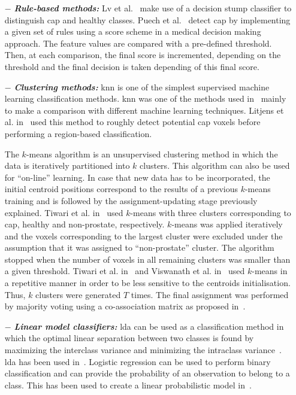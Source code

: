 \begin{enumerate}[leftmargin=*]

\item[$-$] \textbf{\textit{Rule-based methods:}} Lv et al.~\cite{Lv2009} make use of a decision stump classifier to distinguish \ac{cap} and healthy classes. Puech et al.~\cite{Puech2009} detect \ac{cap} by implementing a given set of rules using a score scheme in a medical decision making approach. The feature values are compared with a pre-defined threshold. Then, at each comparison, the final score is incremented, depending on the threshold and the final decision is taken depending of this final score.

\item[$-$] \textbf{\textit{Clustering methods:}} \acf{knn} is one of the simplest supervised machine learning classification methods. \ac{knn} was one of the methods used in~\cite{Niaf2011,Niaf2012} mainly to make a comparison with different machine learning techniques. Litjens et al. in~\cite{Litjens2012} used this method to roughly detect potential \ac{cap} voxels before performing a region-based classification.

 The $k$-means algorithm is an unsupervised clustering method in which the data is iteratively partitioned into $k$ clusters. This algorithm can also be used for ``on-line'' learning. In case that new data has to be incorporated, the initial centroid positions correspond to the results of a previous $k$-means training and is followed by the assignment-updating stage previously explained.
  Tiwari et al. in~\cite{Tiwari2007,Tiwari2009} used $k$-means with three clusters corresponding to \ac{cap}, healthy and non-prostate, respectively. $k$-means was applied iteratively and the voxels corresponding to the largest cluster were excluded under the assumption that it was assigned to ``non-prostate'' cluster. The algorithm stopped when the number of voxels in all remaining clusters was smaller than a given threshold.
 Tiwari et al. in~\cite{Tiwari2008} and Viswanath et al. in~\cite{Viswanath2008,Viswanath2008a} used $k$-means in a repetitive manner in order to be less sensitive to the centroids initialisation. Thus, $k$ clusters were generated $T$ times. The final assignment was performed by majority voting using a co-association matrix as proposed in~\cite{Fred2005}.

\item[$-$] \textbf{\textit{Linear model classifiers:}} \Acf{lda} can be used as a classification method in which the optimal linear separation between two classes is found by maximizing the interclass variance and minimizing the intraclass variance~\cite{Friedman1989}. \Ac{lda} has been used in~\cite{Antic2013,Chan2003,Litjens2014,Niaf2011,Niaf2012,Vos2012}.
  Logistic regression can be used to perform binary classification and can provide the probability of an observation to belong to a class. This has been used to create a linear probabilistic model in~\cite{Kelm2007,Puech2009}.


\end{enumerate}
